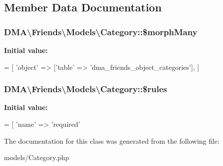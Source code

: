 \subsection{Member Data Documentation}
\hypertarget{classDMA_1_1Friends_1_1Models_1_1Category_a50575142a249c510106a75d42b71391b}{
\subsubsection[{\$morph\+Many}]{\setlength{\rightskip}{0pt plus 5cm}D\+M\+A\textbackslash{}\+Friends\textbackslash{}\+Models\textbackslash{}\+Category\+::\$morph\+Many}}\label{classDMA_1_1Friends_1_1Models_1_1Category_a50575142a249c510106a75d42b71391b}
{\bfseries Initial value\+:}
\begin{DoxyCode}
= [ 
        \textcolor{stringliteral}{'object'} => [\textcolor{stringliteral}{'table'} => \textcolor{stringliteral}{'dma\_friends\_object\_categories'}],
    ]
\end{DoxyCode}
\hypertarget{classDMA_1_1Friends_1_1Models_1_1Category_ad99b16f55603d86e0a22fa60c22c7300}{
\subsubsection[{\$rules}]{\setlength{\rightskip}{0pt plus 5cm}D\+M\+A\textbackslash{}\+Friends\textbackslash{}\+Models\textbackslash{}\+Category\+::\$rules}}\label{classDMA_1_1Friends_1_1Models_1_1Category_ad99b16f55603d86e0a22fa60c22c7300}
{\bfseries Initial value\+:}
\begin{DoxyCode}
= [ 
        \textcolor{stringliteral}{'name'} => \textcolor{stringliteral}{'required'}
\end{DoxyCode}


The documentation for this class was generated from the following file\+:\begin{DoxyCompactItemize}
\item 
models/Category.\+php\end{DoxyCompactItemize}
